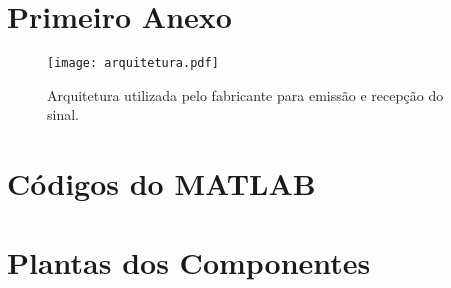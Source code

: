 \begin{anexosenv}

\partanexos

\chapter{Primeiro Anexo}

\begin{figure}[H]
  \centering
  \texttt{[image: arquitetura.pdf]}
  \caption{Arquitetura utilizada pelo fabricante para emissão e recepção do sinal.}
  \label{arquitetura1}
\end{figure}

\chapter{Códigos do MATLAB}
    
\chapter{Plantas dos Componentes}

\end{anexosenv}